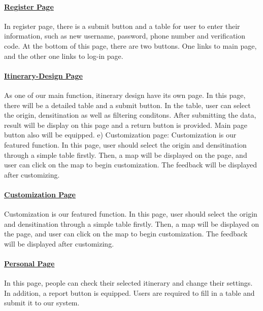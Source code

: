 \documentclass[10pt]{article}
\begin{document}
\paragraph{\underline{Register Page}}
In register page, there is a submit button and a table for user to enter their information, such as new username, password, phone number and verification code. At the bottom of this page, there are two buttons. One links to main page, and the other one links to log-in page.

\paragraph{\underline{Itinerary-Design Page}}
As one of our main function, itinerary design have its own page. In this page, there will be a detailed table and a submit button. In the table, user can select the origin, densitination as well as filtering conditons. After submitting the data, result will be display on this page and a return button is provided. Main page button also will be equipped.
e)	Customization page: Customization is our featured function. In this page, user should select the origin and densitination through a simple table firstly. Then, a map will be displayed on the page, and user can click on the map to begin customization. The feedback will be displayed after customizing.

\paragraph{\underline{Customization Page}}
Customization is our featured function. In this page, user should select the origin and densitination through a simple table firstly. Then, a map will be displayed on the page, and user can click on the map to begin customization. The feedback will be displayed after customizing.

\paragraph{\underline{Personal Page}}
In this page, people can check their selected itinerary and change their settings. In addition, a report button is equipped. Users are required to fill in a table and submit it to our system.
\end{document}
